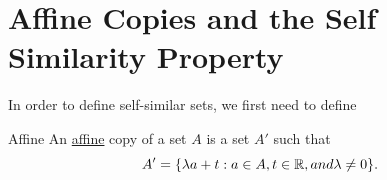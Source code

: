 \section{Affine Copies and the Self Similarity Property}
In order to define self-similar sets, we first need to define 
\begin{definition}{Affine}
    An \underline{affine} copy of a set $A$ is a set $A'$ such that $$A' = \{\lambda a + t : a \in A, t \in \mathbb{R}, and \lambda \neq 0\}.$$
\end{definition}